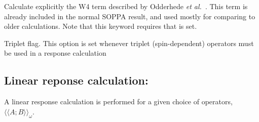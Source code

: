 \begin{description}
\item{}
Calculate explicitly the W4 term described by Odderhede {\it et
al.\/}~\cite{jopjdlycpr2}. This term is already included in the normal
SOPPA result, and used mostly for comparing to older
calculations. Note that this keyword requires that  is set.

\item{}
Triplet flag. This option is set whenever triplet
(spin-dependent)
operators must be used in a response calculation
\cite{jodlypjjcp91,ovhapjhjajthjojcp97}
\end{description}

\subsection{Linear reponse calculation: }

A linear response \cite{jodlypjjcp91,pjhjajjojcp89} 
calculation is performed for a given choice of
operators, $\langle\!\langle A; B \rangle\!\rangle_{\omega}$.

